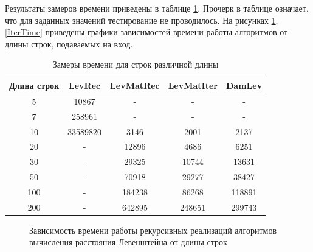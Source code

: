 \documentclass[12pt]{report}
\begin{document}
Результаты замеров времени приведены в таблице \ref{time}. Прочерк в таблице означает, что для заданных значений тестирование не проводилось. На рисунках \ref{recTime}, \ref{IterTime} приведены графики зависимостей времени работы алгоритмов от длины строк, подаваемых на вход.

\newpage
\begin{table}[h]
	\begin{center}
		\caption{\label{time} Замеры времени для строк различной длины}
		\begin{tabular}{|c c c c c|} 
 			\hline
			Длина строк & LevRec & LevMatRec & LevMatIter & DamLev \\ [0.5ex] 
 			\hline\hline
 			5 & 10867 & - & - & -\\
 			\hline
 			7 & 258961 & - & - & -\\
 			\hline
			10 & 33589820 & 3146 & 2001 & 2137\\
			\hline
			20 & - & 12896 & 4686 & 6251\\
			\hline
			30 & - & 29325 & 10744 & 13631\\
			\hline
			50 & - & 70918 & 29277 & 38427\\
			\hline
			100 & - & 184238 & 86268 & 118891\\
			\hline
			200 & - & 642895 & 248651 & 299743\\
			\hline
			\end{tabular}
	\end{center}
\end{table}

\begin{figure}[h]
\begin{center}
	\captionsetup{justification=centering}
	\caption{Зависимость времени работы рекурсивных реализаций алгоритмов вычисления расстояния Левенштейна от длины строк}
	\label{recTime}
	\end{center}
\end{figure}
\end{document}
